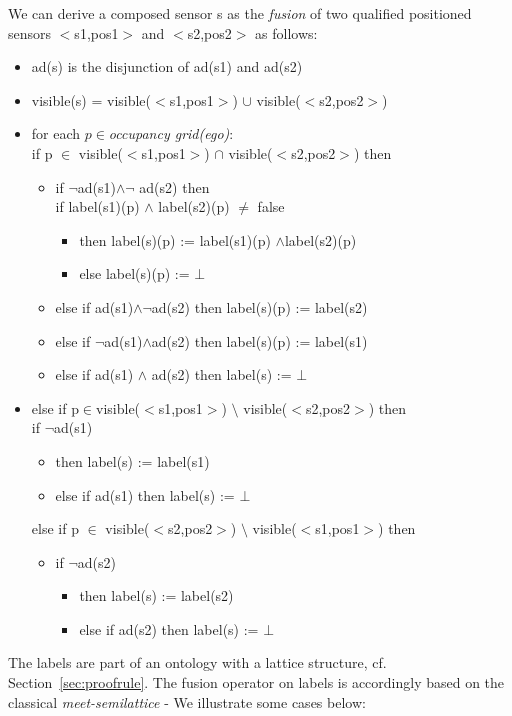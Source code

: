 We can derive a composed sensor s as the \emph{fusion} of two qualified positioned sensors $<$s1,pos1$>$  and $<$s2,pos2$>$ as follows:
%
\begin{itemize}
\item ad(s) is the disjunction of ad(s1) and ad(s2)
\item visible(s) = visible($<$s1,pos1$>$) $\cup$ visible($<$s2,pos2$>$)
\item for each $p\in $\textit{occupancy grid(ego)}:  \\
if p $\in$ visible($<$s1,pos1$>$) $\cap$ visible($<$s2,pos2$>$) then
\begin{itemize}
\item if $\neg$ad(s1)$\land\neg$ ad(s2) then\\
if label(s1)(p) $\land$ label(s2)(p) $\not=$ false 
\begin{itemize}
\item[] then label(s)(p) := label(s1)(p) $\land $label(s2)(p)
\item[] else label(s)(p) := $\bot$
\end{itemize}
\item[] else if ad(s1)$\land\neg$ad(s2) then label(s)(p) := label(s2)
\item[] else if $\neg$ad(s1)$\land$ad(s2) then label(s)(p) := label(s1)
\item[] else if ad(s1) $\land$ ad(s2) then label(s) := $\bot$
\end{itemize}
\item[] else if p$\in$visible($<$s1,pos1$>$) $\setminus$ visible($<$s2,pos2$>$) then\\	
if $\neg$ad(s1)
\begin{itemize}
    \item[] then label(s) := label(s1)
	\item[] else if ad(s1) then label(s) := $\bot$
	\end{itemize}
	else if p $\in$ visible($<$s2,pos2$>$) $\setminus$ visible($<$s1,pos1$>$) then
	\begin{itemize}
	\item[] if $\neg$ad(s2) 
	\begin{itemize}
	    \item[]then label(s) := label(s2)
	\item[] else if ad(s2) then label(s) := $\bot$
    \end{itemize}
    \end{itemize}
\end{itemize}
The labels are part of an ontology with a lattice structure, cf. Section~\ref{sec:proofrule}. The fusion operator on labels is accordingly based on the classical \emph{meet-semilattice} - We illustrate some cases below:
